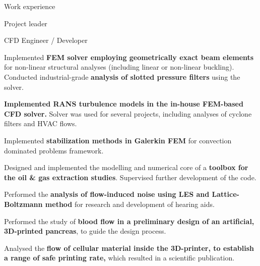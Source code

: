 \documentclass[a4paper, 10pt]{article}
\def \parspace {0.5em}
\begin{document}
{\begin{cvsection}{Work experience}
\begin{entry}{Project leader}{\hfill {}}
		\end{entry}
		\begin{entry}{CFD Engineer / Developer}{\hfill {}}
			\par
			{%
				Implemented \textbf{FEM solver employing geometrically exact beam
					elements} for non-linear structural analyses (including linear or
				non-linear buckling). Conducted industrial-grade \textbf{analysis of
					slotted pressure filters} using the solver.\par
				\vspace{\parspace}
				\textbf{Implemented RANS turbulence models in the in-house FEM-based
					CFD solver.} Solver was used for several projects, including
				analyses of cyclone filters and HVAC flows.\par
				\vspace{\parspace}
				Implemented \textbf{stabilization methods in Galerkin FEM} for
				convection dominated problems framework. \par
				\vspace{\parspace}
				Designed and implemented the modelling and numerical core of a \textbf{toolbox
					for the oil \& gas extraction studies}. Supervised further development of the code.\par
				\vspace{\parspace}
				Performed the \textbf{analysis of flow-induced noise using LES and
					Lattice-Boltzmann method} for research and development of hearing aids.\par
				\vspace{\parspace}
				Performed the study of \textbf{blood flow in a preliminary design of an
					artificial, 3D-printed pancreas}, to guide the design process.\par
				\vspace{\parspace}
				Analysed the \textbf{flow of cellular material inside the 3D-printer, to
					establish a range of safe printing rate,} which resulted in a scientific publication.\par
			}
		\end{entry}

\end{cvsection}}
\end{document}
